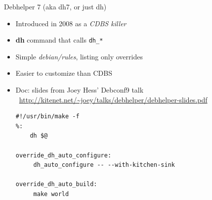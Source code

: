 \documentclass[10pt,final]{beamer}
\begin{document}
\begin{frame}[fragile]{Debhelper 7 (aka dh7, or just dh)}
\begin{itemize}
\item Introduced in 2008 as a \textsl{CDBS killer}
\hbr
\item \textbf{dh} command that calls \texttt{dh\_*}
\hbr
\item Simple \textsl{debian/rules}, listing only overrides
\hbr
\item Easier to customize than CDBS
\hbr
\item Doc: slides from Joey Hess' Debconf9 talk\\\
	\url{http://kitenet.net/~joey/talks/debhelper/debhelper-slides.pdf}
	\br
\begin{lstlisting}[basicstyle=\ttfamily\footnotesize]
#!/usr/bin/make -f
%:
    dh $@

override_dh_auto_configure:
     dh_auto_configure -- --with-kitchen-sink

override_dh_auto_build:
     make world

\end{lstlisting}
\end{itemize}
\end{frame}
\end{document}
